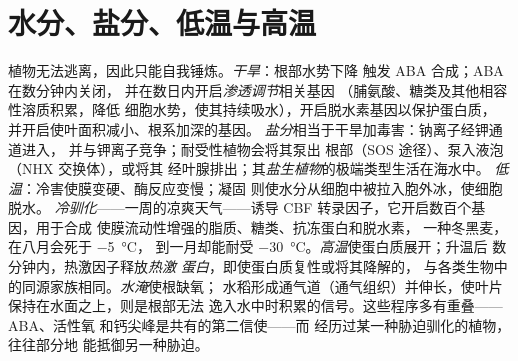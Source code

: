 \section{水分、盐分、低温与高温}

\begin{definition}[非生物胁迫]\label{def:b3:plant-molecular-physiology:abiotic}
植物无法逃离，因此只能自我锤炼。\emph{干旱}：根部水势下降
触发 ABA 合成；ABA 在数分钟内关闭，
并在数日内开启\emph{渗透调节}相关基因
（脯氨酸、糖类及其他相容性溶质积累，降低
细胞水势，使其持续吸水），开启脱水素基因以保护蛋白质，
并开启使叶面积减小、根系加深的基因。
\emph{盐分}相当于干旱加毒害：钠离子经钾通道进入，
并与钾离子竞争；耐受性植物会将其泵出
根部（SOS 途径）、泵入液泡（NHX 交换体），或将其
经叶腺排出；其\emph{盐生植物}的极端类型生活在海水中。
\emph{低温}：冷害使膜变硬、酶反应变慢；凝固
则使水分从细胞中被拉入胞外冰，使细胞脱水。
\emph{冷驯化}——一周的凉爽天气——诱导 CBF
转录因子，它开启数百个基因，用于合成
使膜流动性增强的脂质、糖类、抗冻蛋白和脱水素，
一种冬黑麦，在八月会死于 \qty{-5}{\celsius}，
到一月却能耐受 \qty{-30}{\celsius}。\emph{高温}使蛋白质展开；升温后
数分钟内，热激因子释放\emph{热激
蛋白}，即使蛋白质复性或将其降解的，
与各类生物中的同源家族相同。\emph{水淹}使根缺氧；
水稻形成通气道（通气组织）并伸长，使叶片
保持在水面之上，则是根部无法
逸入水中时积累的信号。这些程序多有重叠——ABA、活性氧
和钙尖峰是共有的第二信使——而
经历过某一种胁迫驯化的植物，往往部分地
能抵御另一种胁迫。
\end{definition}


